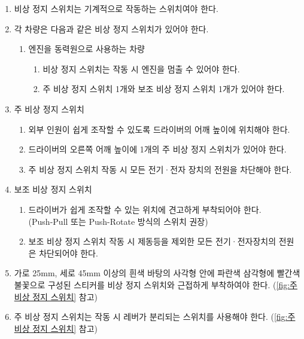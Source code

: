 \documentclass[final,a4paper,10pt]{report}
\begin{document}
\begin{enumerate}
  \item 비상 정지 스위치는 기계적으로 작동하는 스위치여야 한다.
  
  \item 각 차량은 다음과 같은 비상 정지 스위치가 있어야 한다.
    \begin{enumerate}
      \item 엔진을 동력원으로 사용하는 차량
        \begin{enumerate}
          \item 비상 정지 스위치는 작동 시 엔진을 멈출 수 있어야 한다.
          \item 주 비상 정지 스위치 1개와 보조 비상 정지 스위치 1개가 있어야 한다.
        \end{enumerate}
    \end{enumerate}
    
  \item 주 비상 정지 스위치 \label{item:주 비상 정지 스위치}
    \begin{enumerate}
      \item 외부 인원이 쉽게 조작할 수 있도록 드라이버의 어깨 높이에 위치해야 한다.
      \item 드라이버의 오른쪽 어깨 높이에 1개의 주 비상 정지 스위치가 있어야 한다.
      \item 주 비상 정지 스위치 작동 시 모든 전기·전자 장치의 전원을 차단해야 한다.
    \end{enumerate}
    
  \item 보조 비상 정지 스위치 \label{item:보조 비상 정지 스위치}
    \begin{enumerate}
      \item 드라이버가 쉽게 조작할 수 있는 위치에 견고하게 부착되어야 한다.\\
        (Push-Pull 또는 Push-Rotate 방식의 스위치 권장)
      \item 보조 비상 정지 스위치 작동 시 제동등을 제외한 모든 전기·전자장치의 전원은 차단되어야 한다.
    \end{enumerate}
    
  \item 가로 25mm, 세로 45mm 이상의 흰색 바탕의 사각형 안에 파란색 삼각형에 빨간색 불꽃으로 구성된 스티커를 비상 정지 스위치와 근접하게 부착하여야 한다. (\cref{fig:주 비상 정지 스위치} 참고)
  \item 주 비상 정지 스위치는 작동 시 레버가 분리되는 스위치를 사용해야 한다. (\cref{fig:주 비상 정지 스위치} 참고)
  
\end{enumerate}
\end{document}
